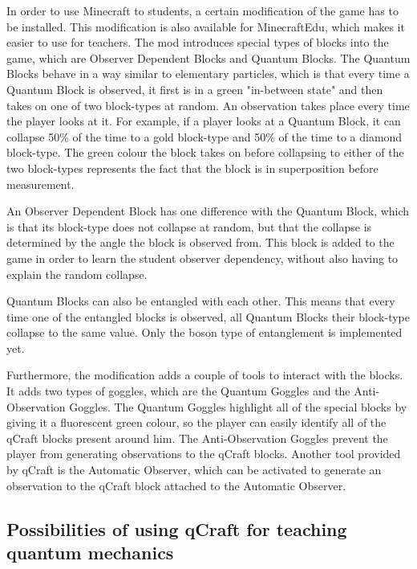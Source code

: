 \documentclass[11pt,twoside]{report} %
\begin{document}
In order to use Minecraft to students, a certain modification of the game has to be installed. This modification is also available for MinecraftEdu, which makes it easier to use for teachers. The mod introduces special types of blocks into the game, which are Observer Dependent Blocks and Quantum Blocks. The Quantum Blocks behave in a way similar to elementary particles, which is that every time a Quantum Block is observed, it first is in a green "in-between state" and then takes on one of two block-types at random. An observation takes place every time the player looks at it. For example, if a player looks at a Quantum Block, it can collapse 50\% of the time to a gold block-type and 50\% of the time to a diamond block-type. The green colour the block takes on before collapsing to either of the two block-types represents the fact that the block is in superposition before measurement.

An Observer Dependent Block has one difference with the Quantum Block, which is that its block-type does not collapse at random, but that the collapse is determined by the angle the block is observed from. This block is added to the game in order to learn the student observer dependency, without also having to explain the random collapse. 

Quantum Blocks can also be entangled with each other. This means that every time one of the entangled blocks is observed, all Quantum Blocks their block-type collapse to the same value. Only the boson type of entanglement is implemented yet.

Furthermore, the modification adds a couple of tools to interact with the blocks. It adds two types of goggles, which are the Quantum Goggles and the Anti-Observation Goggles. The Quantum Goggles highlight all of the special blocks by giving it a fluorescent green colour, so the player can easily identify all of the qCraft blocks present around him. The Anti-Observation Goggles prevent the player from generating observations to the qCraft blocks. Another tool provided by qCraft is the Automatic Observer, which can be activated to generate an observation to the qCraft block attached to the Automatic Observer.

\subsection{Possibilities of using qCraft for teaching quantum mechanics}
\end{document}
